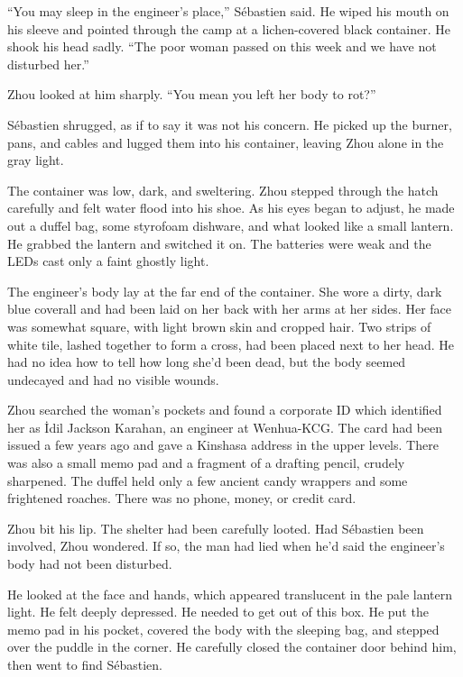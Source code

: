 \documentclass[10pt,b5paper]{article}
\begin{document}
``You may sleep in the engineer's place,'' S\'{e}bastien said. He wiped his
mouth on his sleeve and pointed through the camp at a lichen-covered
black container. He shook his head sadly.  ``The poor woman passed
on this week and we have not disturbed her.''

Zhou looked at him sharply. ``You mean you left her body to rot?''

S\'{e}bastien shrugged, as if to say it was not his concern. He picked
up the burner, pans, and cables and lugged them into his container,
leaving Zhou alone in the gray light.

\bigskip

The container was low, dark, and sweltering. Zhou stepped through
the hatch carefully and felt water flood into his shoe. As his eyes
began to adjust, he made out a duffel bag, some styrofoam dishware,
and what looked like a small lantern. He grabbed the lantern and
switched it on. The batteries were weak and the LEDs cast only a
faint ghostly light.

The engineer's body lay at the far end of the container. She wore
a dirty, dark blue coverall and had been laid on her back with her
arms at her sides. Her face was somewhat square, with light brown
skin and cropped hair. Two strips of white tile, lashed together
to form a cross, had been placed next to her head. He had no idea
how to tell how long she'd been dead, but the body seemed undecayed
and had no visible wounds.

Zhou searched the woman's pockets and found a corporate ID
which identified her as \.{I}dil Jackson Karahan, an engineer at
Wenhua-KCG. The card had been issued a few years ago and gave
a Kinshasa address in the upper levels. There was also a small
memo pad and a fragment of a drafting pencil, crudely sharpened.
The duffel held only a few ancient candy wrappers and some frightened
roaches. There was no phone, money, or credit card.

Zhou bit his lip. The shelter had been carefully looted. Had
S\'{e}bastien been involved, Zhou wondered. If so, the man had lied
when he'd said the engineer's body had not been disturbed.

He looked at the face and hands, which appeared translucent in
the pale lantern light. He felt deeply depressed. He needed to
get out of this box. He put the memo pad in his pocket, covered
the body with the sleeping bag, and stepped over the puddle in
the corner. He carefully closed the container door behind him,
then went to find S\'{e}bastien.
\end{document}
